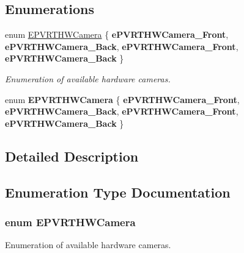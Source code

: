 \subsection*{Enumerations}
\begin{DoxyCompactItemize}
\item 
enum \hyperlink{group___a_p_i___c_a_m_e_r_a_i_n_t_e_r_f_a_c_e_ga973910e3cdfc4daa01afa5adc2fccfdb}{E\+P\+V\+R\+T\+H\+W\+Camera} \{ {\bfseries e\+P\+V\+R\+T\+H\+W\+Camera\+\_\+\+Front}, 
{\bfseries e\+P\+V\+R\+T\+H\+W\+Camera\+\_\+\+Back}, 
{\bfseries e\+P\+V\+R\+T\+H\+W\+Camera\+\_\+\+Front}, 
{\bfseries e\+P\+V\+R\+T\+H\+W\+Camera\+\_\+\+Back}
 \}
\begin{DoxyCompactList}\small\item\em Enumeration of available hardware cameras. \end{DoxyCompactList}\item 
\hypertarget{group___a_p_i___c_a_m_e_r_a_i_n_t_e_r_f_a_c_e_ga973910e3cdfc4daa01afa5adc2fccfdb}{enum {\bfseries E\+P\+V\+R\+T\+H\+W\+Camera} \{ {\bfseries e\+P\+V\+R\+T\+H\+W\+Camera\+\_\+\+Front}, 
{\bfseries e\+P\+V\+R\+T\+H\+W\+Camera\+\_\+\+Back}, 
{\bfseries e\+P\+V\+R\+T\+H\+W\+Camera\+\_\+\+Front}, 
{\bfseries e\+P\+V\+R\+T\+H\+W\+Camera\+\_\+\+Back}
 \}}\label{group___a_p_i___c_a_m_e_r_a_i_n_t_e_r_f_a_c_e_ga973910e3cdfc4daa01afa5adc2fccfdb}

\end{DoxyCompactItemize}


\subsection{Detailed Description}


\subsection{Enumeration Type Documentation}
\hypertarget{group___a_p_i___c_a_m_e_r_a_i_n_t_e_r_f_a_c_e_ga973910e3cdfc4daa01afa5adc2fccfdb}{
\subsubsection[{E\+P\+V\+R\+T\+H\+W\+Camera}]{\setlength{\rightskip}{0pt plus 5cm}enum {\bf E\+P\+V\+R\+T\+H\+W\+Camera}}}\label{group___a_p_i___c_a_m_e_r_a_i_n_t_e_r_f_a_c_e_ga973910e3cdfc4daa01afa5adc2fccfdb}


Enumeration of available hardware cameras. 



 